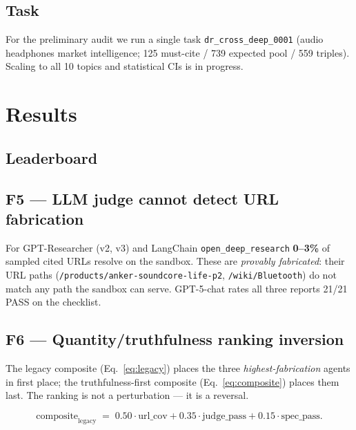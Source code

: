 \documentclass[11pt]{article}
\begin{document}
\subsection{Task}

For the preliminary audit we run a single task
\texttt{dr\_cross\_deep\_0001} (audio headphones market intelligence;
125 must-cite / 739 expected pool / 559 triples). Scaling to all
10 topics and statistical CIs is in progress.

\section{Results}
\label{sec:results}

\subsection{Leaderboard}



\subsection{F5 --- LLM judge cannot detect URL fabrication}
\label{sec:f5}

For GPT-Researcher (v2, v3) and LangChain \texttt{open\_deep\_research}
\textbf{0--3\%} of sampled cited URLs resolve on the sandbox. These are
\emph{provably fabricated}: their URL paths (\texttt{/products/anker-soundcore-life-p2},
\texttt{/wiki/Bluetooth}) do not match any path the sandbox can serve.
GPT-5-chat rates all three reports 21/21 PASS on the checklist.

\subsection{F6 --- Quantity/truthfulness ranking inversion}
\label{sec:f6}



The legacy composite
(Eq.~\ref{eq:legacy}) places the three \emph{highest-fabrication} agents
in first place; the truthfulness-first composite
(Eq.~\ref{eq:composite}) places them last. The ranking is not a
perturbation --- it is a reversal.

\begin{equation}
  \label{eq:legacy}
  \mathrm{composite}_{\text{legacy}}
  \;=\; 0.50\cdot\mathrm{url\_cov}
       + 0.35\cdot\mathrm{judge\_pass}
       + 0.15\cdot\mathrm{spec\_pass}.
\end{equation}
\end{document}
